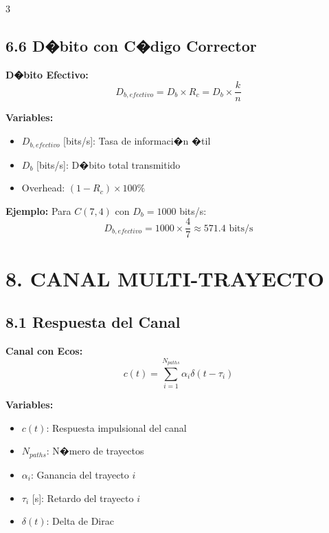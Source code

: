 ﻿\documentclass[8pt,a4paper]{article}
\begin{document}
\begin{multicols}{3}
\vspace{-2mm}
\subsection*{\small 6.6 D�bito con C�digo Corrector}
\vspace{-2mm}

\textbf{D�bito Efectivo:}
\[
D_{b,efectivo} = D_b \times R_c = D_b \times \frac{k}{n}
\]

\textbf{Variables:}
\begin{itemize}[leftmargin=*,itemsep=0pt]
    \item $D_{b,efectivo}$ [bits/s]: Tasa de informaci�n �til
    \item $D_b$ [bits/s]: D�bito total transmitido
    \item Overhead: $(1 - R_c) \times 100\%$
\end{itemize}

\textbf{Ejemplo:} Para $C(7,4)$ con $D_b = 1000$ bits/s:
\[
D_{b,efectivo} = 1000 \times \frac{4}{7} \approx 571.4 \text{ bits/s}
\]

\vspace{-2mm}
\section*{\color{sectioncolor}\normalsize 8. CANAL MULTI-TRAYECTO}
\vspace{-3mm}

\subsection*{\small 8.1 Respuesta del Canal}
\vspace{-2mm}

\textbf{Canal con Ecos:}
\[
c(t) = \sum_{i=1}^{N_{paths}} \alpha_i \delta(t - \tau_i)
\]

\textbf{Variables:}
\begin{itemize}[leftmargin=*,itemsep=0pt]
    \item $c(t)$: Respuesta impulsional del canal
    \item $N_{paths}$: N�mero de trayectos
    \item $\alpha_i$: Ganancia del trayecto $i$
    \item $\tau_i$ [s]: Retardo del trayecto $i$
    \item $\delta(t)$: Delta de Dirac
\end{itemize}

\vspace{-2mm}

\end{multicols}
\end{document}
